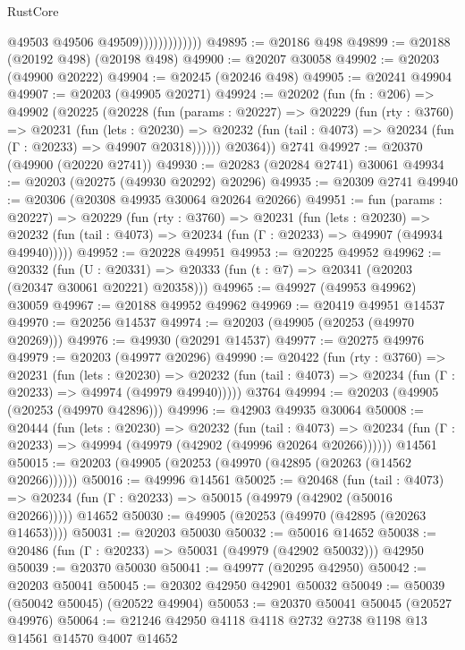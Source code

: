 \begin{lexlean}{RustCore}
\begin{coremodule}
                              @49503
                              @49506
                              @49509)))))))))))))
@49895 := @20186 @498
@49899 := @20188 (@20192 @498) (@20198 @498)
@49900 := @20207 @30058
@49902 := @20203 (@49900 @20222)
@49904 := @20245 (@20246 @498)
@49905 := @20241 @49904
@49907 := @20203 (@49905 @20271)
@49924 := @20202
    (fun (fn : @206) =>
    @49902
      (@20225
        (@20228
          (fun (params : @20227) =>
          @20229
            (fun (rty : @3760) =>
            @20231
              (fun (lets : @20230) =>
              @20232 (fun (tail : @4073) => @20234 (fun (Γ : @20233) => @49907 @20318))))))
        @20364))
    @2741
@49927 := @20370 (@49900 (@20220 @2741))
@49930 := @20283 (@20284 @2741) @30061
@49934 := @20203 (@20275 (@49930 @20292) @20296)
@49935 := @20309 @2741
@49940 := @20306 (@20308 @49935 @30064 @20264 @20266)
@49951 := fun (params : @20227) =>
  @20229
    (fun (rty : @3760) =>
    @20231
      (fun (lets : @20230) =>
      @20232 (fun (tail : @4073) => @20234 (fun (Γ : @20233) => @49907 (@49934 @49940)))))
@49952 := @20228 @49951
@49953 := @20225 @49952
@49962 := @20332
    (fun (U : @20331) => @20333 (fun (t : @7) => @20341 (@20203 (@20347 @30061 @20221) @20358)))
@49965 := @49927 (@49953 @49962) @30059
@49967 := @20188 @49952 @49962
@49969 := @20419 @49951 @14537
@49970 := @20256 @14537
@49974 := @20203 (@49905 (@20253 (@49970 @20269)))
@49976 := @49930 (@20291 @14537)
@49977 := @20275 @49976
@49979 := @20203 (@49977 @20296)
@49990 := @20422
    (fun (rty : @3760) =>
    @20231
      (fun (lets : @20230) =>
      @20232 (fun (tail : @4073) => @20234 (fun (Γ : @20233) => @49974 (@49979 @49940)))))
    @3764
@49994 := @20203 (@49905 (@20253 (@49970 @42896)))
@49996 := @42903 @49935 @30064
@50008 := @20444
    (fun (lets : @20230) =>
    @20232
      (fun (tail : @4073) =>
      @20234 (fun (Γ : @20233) => @49994 (@49979 (@42902 (@49996 @20264 @20266))))))
    @14561
@50015 := @20203 (@49905 (@20253 (@49970 (@42895 (@20263 (@14562 @20266))))))
@50016 := @49996 @14561
@50025 := @20468
    (fun (tail : @4073) => @20234 (fun (Γ : @20233) => @50015 (@49979 (@42902 (@50016 @20266)))))
    @14652
@50030 := @49905 (@20253 (@49970 (@42895 (@20263 @14653))))
@50031 := @20203 @50030
@50032 := @50016 @14652
@50038 := @20486 (fun (Γ : @20233) => @50031 (@49979 (@42902 @50032))) @42950
@50039 := @20370 @50030
@50041 := @49977 (@20295 @42950)
@50042 := @20203 @50041
@50045 := @20302 @42950 @42901 @50032
@50049 := @50039 (@50042 @50045) (@20522 @49904)
@50053 := @20370 @50041 @50045 (@20527 @49976)
@50064 := @21246 @42950 @4118 @4118 @2732 @2738 @1198 @13 @14561 @14570 @4007 @14652

\end{coremodule}
\end{lexlean}
